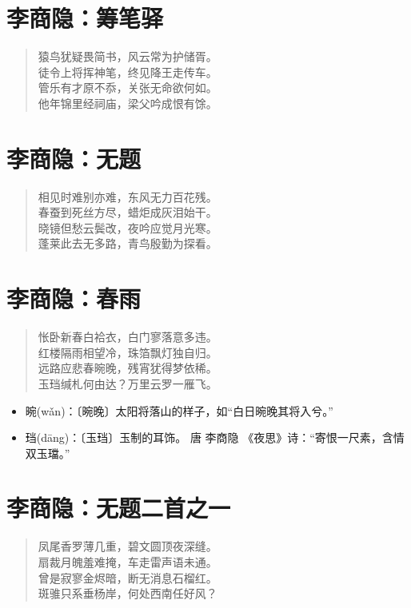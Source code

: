 \documentclass[12pt,oneside]{book}
\newenvironment{shici}{
\begin{verse}
\centering\large\hspace{12pt}}
{\end{verse}}
\begin{document}
\chapter{李商隐：筹笔驿}
\begin{shici}
猿鸟犹疑畏简书，风云常为护储胥。\\
徒令上将挥神笔，终见降王走传车。\\
管乐有才原不忝，关张无命欲何如。\\
他年锦里经祠庙，梁父吟成恨有馀。
\end{shici}

\chapter{李商隐：无题}
\begin{shici}
相见时难别亦难，东风无力百花残。\\
春蚕到死丝方尽，蜡炬成灰泪始干。\\
晓镜但愁云鬓改，夜吟应觉月光寒。\\
蓬莱此去无多路，青鸟殷勤为探看。
\end{shici}

\chapter{李商隐：春雨}
\begin{shici}
怅卧新春白袷衣，白门寥落意多违。\\
红楼隔雨相望冷，珠箔飘灯独自归。\\
远路应悲春晼晚，残宵犹得梦依稀。\\
玉珰缄札何由达？万里云罗一雁飞。
\end{shici}

\begin{itemize}
\item 晼(wǎn)：〔晼晚〕太阳将落山的样子，如“白日晼晚其将入兮。”
\item 珰(dāng)：〔玉珰〕玉制的耳饰。 唐 李商隐 《夜思》诗：“寄恨一尺素，含情双玉璫。”
\end{itemize}

\chapter{李商隐：无题二首之一}
\begin{shici}
凤尾香罗薄几重，碧文圆顶夜深缝。\\
扇裁月魄羞难掩，车走雷声语未通。\\
曾是寂寥金烬暗，断无消息石榴红。\\
斑骓只系垂杨岸，何处西南任好风？
\end{shici}
\end{document}
